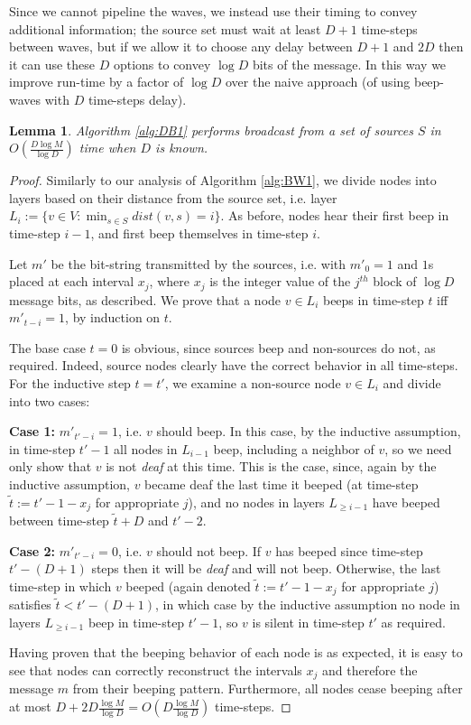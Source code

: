 \documentclass{article}
\newtheorem{lemma}[theorem]{Lemma}
\begin{document}
Since we cannot pipeline the waves, we instead use their timing to convey additional information; the source set must wait at least $D+1$ time-steps between waves, but if we allow it to choose any delay between $D+1$ and $2D$ then it can use these $D$ options to convey $\log D$ bits of the message. In this way we improve run-time by a factor of $\log D$ over the naive approach (of using beep-waves with $D$ time-steps delay).

\begin{lemma}
	Algorithm \ref{alg:DB1} performs broadcast from a set of sources $S$ in $O(\frac{D\log M}{\log D})$ time when $D$ is known.
\end{lemma}

\begin{proof}
	Similarly to our analysis of Algorithm \ref{alg:BW1}, we divide nodes into layers based on their distance from the source set, i.e. layer $L_i := \{v\in V : \min_{s\in S} dist(v,s) = i\}$. As before, nodes hear their first beep in time-step $i-1$, and first beep themselves in time-step $i$. 
	
	Let $m'$ be the bit-string transmitted by the sources, i.e. with $m'_0 = 1$ and $1$s placed at each interval $x_j$, where $x_j$ is the integer value of the $j^{th}$ block of $\log D$ message bits, as described. We prove that a node $v\in L_i$ beeps in time-step $t$ iff $m'_{t-i}=1$, by induction on $t$.
	
	The base case $t=0$ is obvious, since sources beep and non-sources do not, as required. Indeed, source nodes clearly have the correct behavior in all time-steps. For the inductive step $t=t'$, we examine a non-source node $v \in L_i$ and divide into two cases:
	
	\textbf{Case 1:} $m'_{t'-i}=1$, i.e. $v$ should beep. In this case, by the inductive assumption, in time-step $t'-1$ all nodes in $L_{i-1}$ beep, including a neighbor of $v$, so we need only show that $v$ is not \emph{deaf} at this time. This is the case, since, again by the inductive assumption, $v$ became deaf the last time it beeped (at time-step $\tilde t := t'-1-x_j$ for appropriate $j$), and no nodes in layers $L_{\geq i-1}$ have beeped between time-step $\tilde t + D$ and $t'-2$.
	
	\textbf{Case 2:} $m'_{t'-i}=0$, i.e. $v$ should not beep. If $v$ has beeped since time-step $t'-(D+1)$ steps then it will be \emph{deaf} and will not beep. Otherwise, the last time-step in which $v$ beeped (again denoted $\tilde t := t'-1-x_j$ for appropriate $j$) satisfies $\tilde t < t' - (D+1)$, in which case by the inductive assumption no node in layers $L_{\geq i-1}$ beep in time-step $t'-1$, so $v$ is silent in time-step $t'$ as required.
	
	Having proven that the beeping behavior of each node is as expected, it is easy to see that nodes can correctly reconstruct the intervals $x_j$ and therefore the message $m$ from their beeping pattern. Furthermore, all nodes cease beeping after at most $D+ 2D\frac{\log M}{\log D} = O(D\frac{\log M}{\log D})$ time-steps.
\end{proof}
\end{document}
